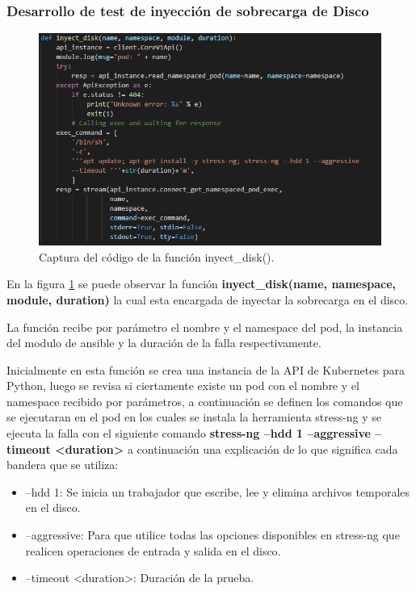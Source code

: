 \subsubsection{Desarrollo de test de inyección de sobrecarga de Disco}

\begin{figure}[htpb!]
	\centering
	\includegraphics[width=0.95\columnwidth]{images/captures/codigo/Capture_inyect_disk.PNG}
	\caption{Captura del código de la función inyect\_disk().}
	\label{fig:codi05}
\end{figure}

\par En la figura \ref{fig:codi05} se puede observar la función \textbf{ inyect\_disk(name, namespace, module, duration)} la cual esta encargada de inyectar la sobrecarga en el disco.\\
\par La función recibe por parámetro el nombre y el namespace del pod, la instancia del modulo de ansible y la duración de la falla respectivamente. \\

\par Inicialmente en esta función se crea una instancia de la API de Kubernetes para Python, luego se revisa si ciertamente existe un pod con el nombre y el namespace recibido por parámetros, a continuación se definen los comandos que se ejecutaran en el pod en los cuales se instala la herramienta stress-ng y se ejecuta la falla con el siguiente comando
\textbf{stress-ng --hdd 1 --aggressive --timeout <duration> } a continuación una explicación de lo que significa cada bandera que se utiliza:
\begin{itemize}
        \item --hdd 1: Se inicia un trabajador que escribe, lee y elimina archivos temporales en el disco.        
        \item --aggressive: Para que utilice todas las opciones disponibles en stress-ng que realicen operaciones de entrada y salida en el disco.
        \item --timeout <duration>: Duración de la prueba.\\
    \end{itemize}

